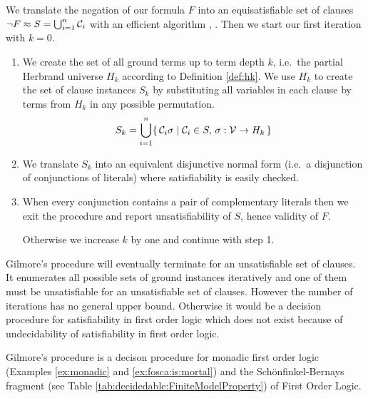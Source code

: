 \begin{procedure}\label{proc:gilmore's:prover}
	We translate the negation of our formula \(F\) into an equisatisfiable set of clauses
	\(\lnot F \approx S = \bigcup_{i=1}^{n} \mathcal{C}_i\) with an efficient algorithm \cite{tseitin70}, \cite{PLAISTED1986293}.
	Then we start our first iteration with \(k=0\).
	\begin{enumerate}

		\item We create the set of all ground terms up to term depth \(k\),
		i.e.~the partial Herbrand universe \(H_k\) according to Definition \ref{def:hk}.
		We use \(H_k\) to create the set of clause instances \(S_k\)
		by substituting all variables
		in each clause by terms from \(H_k\) in any possible permutation.
		\[ S_k = \bigcup_{i=1}^{n}
		\{\,
		\mathcal{C}_i\sigma \mid \mathcal{C}_i \in S,\,\sigma: \mathcal{V}\to H_k
		\,\}
		\]

		\item We translate \(S_k\) into an equivalent disjunctive normal form
		(i.e.~a disjunction of conjunctions of literals)
		where satisfiability is easily checked.



		\item When every conjunction contains a pair of complementary literals
		then we exit the procedure and report unsatisfiability of \(S\),
		hence validity of \(F\).

		Otherwise we increase \(k\) by one and continue with step 1.
	\end{enumerate}
\end{procedure}

Gilmore's procedure will eventually terminate for an unsatisfiable set of clauses.
It enumerates all possible sets of ground instances iteratively
and one of them must be unsatisfiable for an unsatisfiable set of clauses.
However the number of iterations has no general upper bound.
Otherwise it would be a decision procedure for satisfiability in first order logic
which does not exist because of undecidability of satisfiability in first order logic.

\begin{lemma}
	Gilmore's procedure is a decison procedure for monadic first order logic
	(Examples \ref{ex:monadic}  and \ref{ex:fosca:is:mortal})
	and the Schönfinkel-Bernays fragment (see Table \ref{tab:decidedable:FiniteModelProperty})
	of First Order Logic.
\end{lemma}

